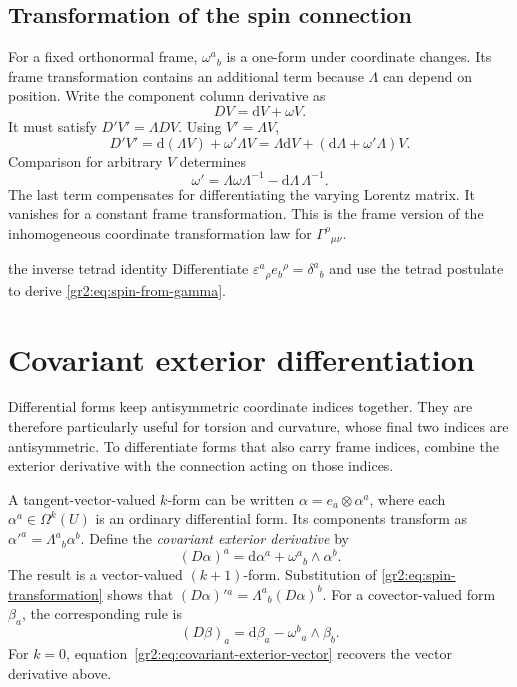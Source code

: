 \documentclass[11pt,a4paper]{article}
\numberwithin{equation}{section}
\newcommand{\dd}{\mathrm d}
\newcommand{\slideref}[1]{\par\nobreak\smallskip\nobreak{\footnotesize\color{ink!60}\textsc{Source slide #1}}\par\nobreak\smallskip\nobreak}
\newcommand{\slidesref}[1]{\par\nobreak\smallskip\nobreak{\footnotesize\color{ink!60}\textsc{Source slides #1}}\par\nobreak\smallskip\nobreak}
\begin{document}
\subsection{Transformation of the spin connection}
\slideref{18}

For a fixed orthonormal frame, \(\omega^a{}_b\) is a one-form under
coordinate changes. Its frame transformation contains an additional
term because \(\Lambda\) can depend on position. Write the component
column derivative as
\[
 DV=\dd V+\omega V.
\]
It must satisfy \(D'V'=\Lambda DV\). Using \(V'=\Lambda V\),
\[
 D'V'=\dd(\Lambda V)+\omega'\Lambda V
 =\Lambda\dd V+(\dd\Lambda+\omega'\Lambda)V.
\]
Comparison for arbitrary \(V\) determines
\begin{equation}
 \boxed{\omega'=\Lambda\omega\Lambda^{-1}
                   -\dd\Lambda\,\Lambda^{-1}.}
 \label{gr2:eq:spin-transformation}
\end{equation}
The last term compensates for differentiating the varying Lorentz
matrix. It vanishes for a constant frame transformation. This is the
frame version of the inhomogeneous coordinate transformation law
for \(\Gamma^\rho{}_{\mu\nu}\).

\begin{studentwork}[2.5cm]{the inverse tetrad identity}
Differentiate \(\varepsilon^a{}_\rho e_b{}^\rho=\delta^a{}_b\)
and use the tetrad postulate to derive
\eqref{gr2:eq:spin-from-gamma}.
\end{studentwork}

\section{Covariant exterior differentiation}
\label{gr2:sec:covariant-exterior}
\slidesref{18--19}

Differential forms keep antisymmetric coordinate indices together.
They are therefore particularly useful for torsion and curvature,
whose final two indices are antisymmetric. To differentiate forms
that also carry frame indices, combine the exterior derivative with
the connection acting on those indices.

A tangent-vector-valued \(k\)-form can be written
\(\alpha=e_a\otimes\alpha^a\), where each
\(\alpha^a\in\Omega^k(U)\) is an ordinary differential form.
Its components transform as \(\alpha'^a=\Lambda^a{}_b\alpha^b\).
Define the \emph{covariant exterior derivative} by
\begin{equation}
 (D\alpha)^a=\dd\alpha^a+\omega^a{}_b\wedge\alpha^b.
 \label{gr2:eq:covariant-exterior-vector}
\end{equation}
The result is a vector-valued \((k+1)\)-form. Substitution of
\eqref{gr2:eq:spin-transformation} shows that
\((D\alpha)'{}^a=\Lambda^a{}_b(D\alpha)^b\). For a covector-valued
form \(\beta_a\), the corresponding rule is
\[
 (D\beta)_a=\dd\beta_a-\omega^b{}_a\wedge\beta_b.
\]
For \(k=0\), equation~\eqref{gr2:eq:covariant-exterior-vector}
recovers the vector derivative above.
\end{document}
